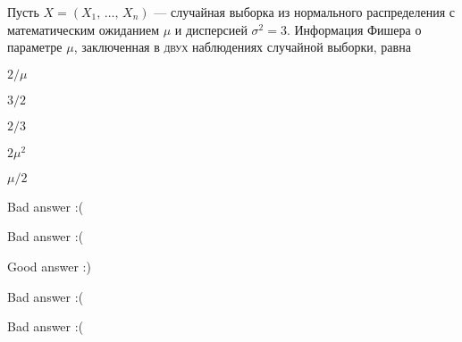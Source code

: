 
\begin{question}
Пусть \(X = (X_1, \, \ldots, \, X_n)\) — случайная выборка из
нормального распределения с математическим ожиданием \(\mu\) и
дисперсией \(\sigma^2 = 3\). Информация Фишера о параметре \(\mu\),
заключенная в \textsc{двух} наблюдениях случайной выборки, равна
\begin{answerlist}
  \item \(2 / \mu\)
  \item \(3 / 2\)
  \item \(2 / 3\)
  \item \(2 \mu^2\)
  \item \(\mu / 2\)
\end{answerlist}
\end{question}

\begin{solution}
\begin{answerlist}
  \item Bad answer :(
  \item Bad answer :(
  \item Good answer :)
  \item Bad answer :(
  \item Bad answer :(
\end{answerlist}
\end{solution}

